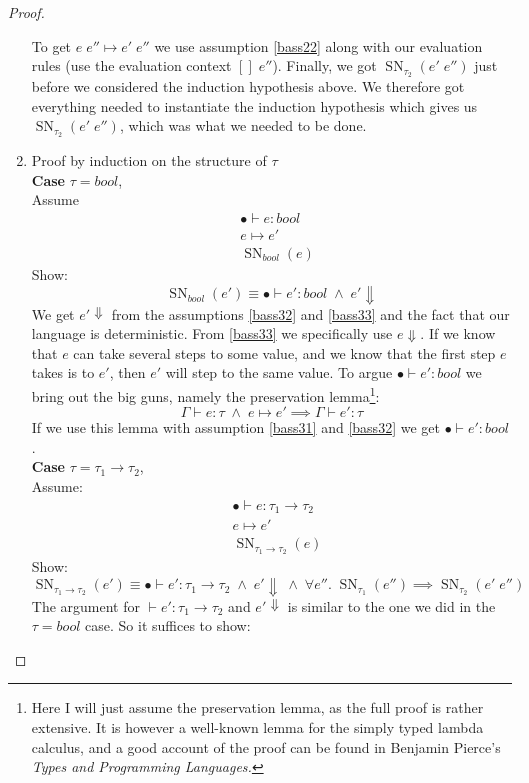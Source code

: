 \documentclass[a4paper,10pt,fleqn]{article}
\DeclareMathOperator{\SNPred}{SN}
\newcommand{\evalto}{\ensuremath{\mapsto}}
\newcommand{\mtenv}{\ensuremath{\bullet}}
\newcommand{\case}[1]{~\\{\bf Case} #1,~\\}
\newcommand{\tarrow}[2]{\ensuremath{ #1 \rightarrow #2}}
\newcommand{\SN}[2]{\ensuremath{\SNPred_{#1}(#2)}}
\newcommand{\pand}{\ensuremath{\; \wedge \;}}
\begin{document}
\begin{proof}
\begin{enumerate}
\begin{comment}
                   {\mtenv \vdash e'' : \tau_1}}
                 {\mtenv \vdash e \; e'' : \tau_2}
                 \]
    \end{comment}
To get $e \; e'' \evalto e' \; e''$ we use assumption \ref{bass22} along with our evaluation rules (use the evaluation context $[]\; e''$). Finally, we got $\SN{\tau_2}{e' \; e''}$ just before we considered the induction hypothesis above. We therefore got everything needed to instantiate the induction hypothesis which gives us $\SN{\tau_2}{e' \; e''}$, which was what we needed to be done.
  \item Proof by induction on the structure of $\tau$
    \case{$\tau=bool$} 
Assume
    \begin{align}
      &\mtenv \vdash e : bool \label{bass31}\\
      &e\evalto e' \label{bass32} \\
      &\SN{bool}{e} \label{bass33}
    \end{align}
    Show:
    \[
    \SN{bool}{e'} \equiv \mtenv \vdash e' : bool \pand e' \Downarrow
    \]
  We get $e' \Downarrow$ from the assumptions \ref{bass32} and \ref{bass33} and the fact that our language is deterministic. From \ref{bass33} we specifically use $e \Downarrow$. If we know that $e$ can take several steps to some value, and we know that the first step $e$ takes is to $e'$, then $e'$ will step to the same value. 
To argue $\mtenv \vdash e' : bool$ we bring out the big guns, namely the preservation lemma\footnote{Here I will just assume the preservation lemma, as the full proof is rather extensive. It is however a well-known lemma for the simply typed lambda calculus, and a good account of the proof can be found in Benjamin Pierce's \emph{Types and Programming Languages.}}:
\[
  \Gamma \vdash e : \tau \pand e \evalto e' \implies \Gamma \vdash e' : \tau
\]
If we use this lemma with assumption \ref{bass31} and \ref{bass32} we get $\mtenv \vdash e' : bool$.
%
%
    \case{$\tau=\tarrow{\tau_1}{\tau_2}$} Assume:
    \begin{align}
      &\mtenv \vdash e : \tarrow{\tau_1}{\tau_2} \label{bass41}\\
      &e\evalto e' \label{bass42} \\
      &\SN{\tarrow{\tau_1}{\tau_2}}{e} \label{bass43}
    \end{align}
    Show:
    \[
    \SN{\tarrow{\tau_1}{\tau_2}}{e'} \equiv \mtenv \vdash e' : \tarrow{\tau_1}{\tau_2} \pand e' \Downarrow \pand \forall e''. \; \SN{\tau_1}{e''} \implies \SN{\tau_2}{e' \; e''}
    \]
    The argument for $\vdash e' : \tarrow{\tau_1}{\tau_2}$ and $e' \Downarrow$ is similar to the one we did in the $\tau=bool$ case. So it suffices to show:

\end{enumerate}
\end{proof}
\end{document}
